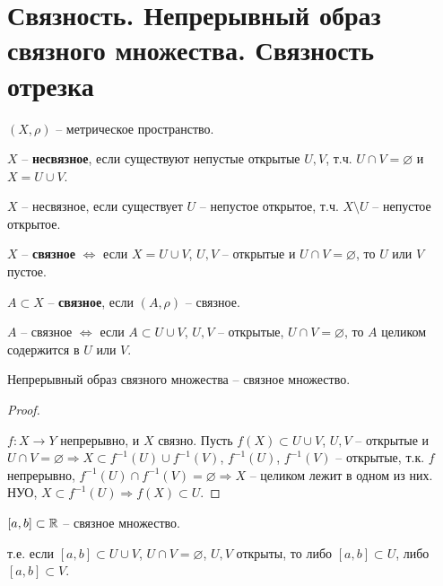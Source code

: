 
\section{Связность. Непрерывный образ связного множества. Связность отрезка}


\begin{conj}
    $(X, \rho)$ -- метрическое пространство.
    
    $X$ -- \textbf{несвязное}, если существуют непустые открытые $U, V$, 
    т.ч. $U \cap V = \varnothing$ и $X = U \cup V$.
\end{conj}

\notice $X$ -- несвязное, если существует $U$ -- непустое
открытое, т.ч. $X \setminus U$ -- непустое открытое.

\begin{conj}
    $X$ -- \textbf{связное} $\Longleftrightarrow$ если $X = U \cup V$, 
    $U, V$ -- открытые и $U \cap V = \varnothing$, то $U$ или $V$ пустое.
\end{conj}

\begin{conj}
    $A \subset X$ -- \textbf{связное}, если $(A, \rho)$ -- связное.
\end{conj}

\notice $A$ -- связное $\Longleftrightarrow$ если $A \subset U \cup V$,
$U, V$ -- открытые, $U \cap V = \varnothing$, то $A$ целиком содержится
в $U$ или $V$.

\begin{theorem-non}
    Непрерывный образ связного множества -- связное множество.
\end{theorem-non}
\begin{proof} $ $

    $f: X \rightarrow Y$ непрерывно, и $X$ связно. Пусть $f(X) \subset
    U \cup V$, $U, V$ -- открытые и $U \cap V = \varnothing \Rightarrow
    X \subset f^{-1}(U) \cup f^{-1}(V)$, $f^{-1}(U)$, $f^{-1}(V)$ --
    открытые, т.к. $f$ непрерывно, $f^{-1}(U) \cap f^{-1}(V) =
    \varnothing \Rightarrow X$ -- целиком лежит в одном из них.
    НУО, $X \subset f^{-1}(U) \Rightarrow f(X) \subset U$.
\end{proof}

\begin{theorem-non}
$[a, b] \subset \mathbb{R}$ -- связное множество.
\end{theorem-non}
т.е. если $[a, b] \subset U \cup V$, $U \cap V = \varnothing$, $U, V$
открыты, то либо $[a, b] \subset U$, либо $[a, b] \subset V$.

